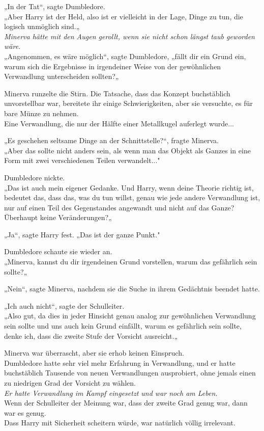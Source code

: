 {„In der Tat“, sagte Dumbledore.\\ „Aber Harry ist der Held, also ist er vielleicht in der Lage, Dinge zu tun, die logisch unmöglich sind.„\\ \emph{Minerva hätte mit den Augen gerollt, wenn sie nicht schon längst taub geworden wäre.}\\ „Angenommen, es wäre möglich“, sagte Dumbledore, „fällt dir ein Grund ein, warum sich die Ergebnisse in irgendeiner Weise von der gewöhnlichen Verwandlung unterscheiden sollten?„

Minerva runzelte die Stirn. Die Tatsache, dass das Konzept buchstäblich unvorstellbar war, bereitete ihr einige Schwierigkeiten, aber sie versuchte, es für bare Münze zu nehmen.\\ Eine Verwandlung, die nur der Hälfte einer Metallkugel auferlegt wurde...

„Es geschehen seltsame Dinge an der Schnittstelle?“, fragte Minerva.\\ „Aber das sollte nicht anders sein, als wenn man das Objekt als Ganzes in eine Form mit zwei verschiedenen Teilen verwandelt..."

Dumbledore nickte.\\ „Das ist auch mein eigener Gedanke. Und Harry, wenn deine Theorie richtig ist, bedeutet das, dass das, was du tun willst, genau wie jede andere Verwandlung ist, nur auf einen Teil des Gegenstandes angewandt und nicht auf das Ganze? Überhaupt keine Veränderungen?„

„Ja“, sagte Harry fest. „Das ist der ganze Punkt."

Dumbledore schaute sie wieder an.\\ „Minerva, kannst du dir irgendeinen Grund vorstellen, warum das gefährlich sein sollte?„

„Nein“, sagte Minerva, nachdem sie die Suche in ihrem Gedächtnis beendet hatte.

„Ich auch nicht“, sagte der Schulleiter.\\ „Also gut, da dies in jeder Hinsicht genau analog zur gewöhnlichen Verwandlung sein sollte und uns auch kein Grund einfällt, warum es gefährlich sein sollte, denke ich, dass die zweite Stufe der Vorsicht ausreicht.„

Minerva war überrascht, aber sie erhob keinen Einspruch.\\ Dumbledore hatte sehr viel mehr Erfahrung in Verwandlung, und er hatte buchstäblich Tausende von neuen Verwandlungen ausprobiert, ohne jemals einen zu niedrigen Grad der Vorsicht zu wählen.\\ \emph{Er hatte Verwandlung im Kampf eingesetzt und war noch am Leben.}\\ Wenn der Schulleiter der Meinung war, dass der zweite Grad genug war, dann war es genug.\\ Dass Harry mit Sicherheit scheitern würde, war natürlich völlig irrelevant.

}

